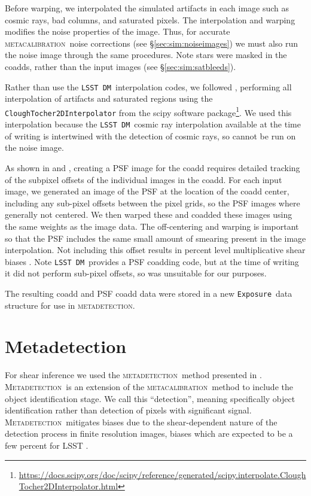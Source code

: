 \documentclass[twocolumn,twocolappendix,astrosym]{openjournal}
\newcommand{\calexp}{\texttt{Exposure}}
\newcommand{\dm}{\texttt{LSST DM}}
\newcommand{\mcal}{\textsc{metacalibration}}
\newcommand{\mdet}{\textsc{metadetection}}
\newcommand{\Mdet}{\textsc{Metadetection}}
\begin{document}
Before warping, we interpolated the simulated artifacts in each image such as
cosmic rays, bad columns, and saturated pixels.  The interpolation and warping
modifies the noise properties of the image.  Thus, for accurate \mcal\ noise
corrections (see \S \ref{sec:sim:noiseimages}) we must also run the noise image
through the same procedures.  Note stars were masked in the coadds, rather than
the input images (see \S \ref{sec:sim:satbleeds}).

Rather than use the \dm\ interpolation codes, we followed \citet{BeckerMdetCoadd},
performing all interpolation of artifacts and saturated regions using the
\texttt{CloughTocher2DInterpolator} from the scipy software
package\footnote{\url{https://docs.scipy.org/doc/scipy/reference/generated/scipy.interpolate.CloughTocher2DInterpolator.html}}.
We used this interpolation because the \dm\ cosmic ray interpolation available
at the time of writing is intertwined with the detection of cosmic rays, so
cannot be run on the noise image.

As shown in \citet{ArmstrongCoadd} and \citet{BeckerMdetCoadd}, creating a PSF
image for the coadd requires detailed tracking of the subpixel offsets of the
individual images in the coadd. For each input image,
we generated an image of the PSF at the location of the coadd center, including
any sub-pixel offsets between the pixel grids, so the PSF images where
generally not centered.  We then warped these and coadded these images using
the same weights as the image data.  The off-centering and warping is important
so that the PSF includes the same small amount of smearing present in the image
interpolation.  Not including this offset results in percent level
multiplicative shear biases \citep{ArmstrongCoadd}.  Note \dm\ provides a
PSF coadding code, but at the time of writing it did not perform sub-pixel
offsets, so was unsuitable for our purposes.

The resulting coadd and PSF coadd data were stored in a new \calexp\ data
structure for use in \mdet.

\section{Metadetection} \label{sec:mdet}

For shear inference we used the \mdet\ method presented in \cite{mdet20}.
\Mdet\ is an extension of the \mcal\ method
\citep{HuffMcal2017,SheldonMcal2017} to include the object identification
stage. We call this ``detection'', meaning specifically object identification
rather than detection of pixels with significant signal.  \Mdet\ mitigates
biases due to the shear-dependent nature of the detection process in finite
resolution images, biases which are expected to be a few percent for LSST
\citep{mdet20}.
\end{document}
